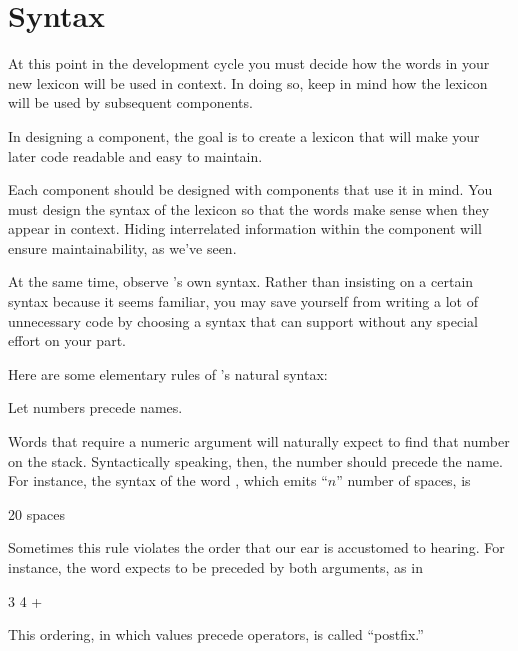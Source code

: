 \section{\Forth{} Syntax}%
%
%

At this point in the development cycle you must decide how the words in
your new lexicon will be used in context. In doing so, keep in mind how
the lexicon will be used by subsequent components.

\begin{tip}
In designing a component, the goal is to create a lexicon that will make your
later code readable and easy to maintain.
\end{tip}
Each component should be designed with components that use it in mind.
You must design the syntax of the lexicon so that the words make sense
when they appear in context. Hiding interrelated information within the
component will ensure maintainability, as we've seen.

At the same time, observe \Forth{}'s own syntax. Rather than insisting
on a certain syntax because it seems familiar, you may save
yourself from writing a lot of unnecessary code by choosing a syntax that
\Forth{} can support without any special effort on your part.

Here are some elementary rules of \Forth{}'s natural syntax:

\begin{tip}
Let numbers precede names.
\end{tip}
Words that require a numeric argument will naturally expect to find that
number on the stack. Syntactically speaking, then, the number should
precede the name. For instance, the syntax of the word , which
emits ``$n$'' number of spaces, is

\begin{Code}
20 spaces
\end{Code}
Sometimes this rule violates the order that our ear is accustomed to
hearing. For instance, the \Forth{} word \forth{+} expects to be preceded
by both arguments, as in

\begin{Code}
3 4 +
\end{Code}
This ordering, in which values precede operators, is called ``postfix.''

